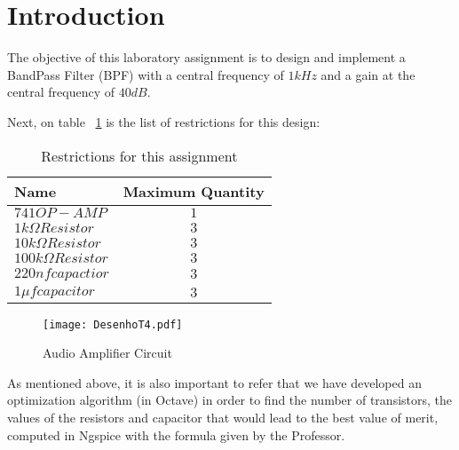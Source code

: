\newpage
\section{Introduction}
\label{sec:introduction}

The objective of this laboratory assignment is to design and implement a BandPass Filter (BPF) with a central frequency of $1kHz$ and a gain at the central frequency of $40dB$.

Next, on table ~\ref{tab:restrictions} is the list of restrictions for this design:

\begin{table}[h]
    \centering
    \begin{tabular}{|l|c|}
    \hline
    {\bf Name} & {\bf Maximum Quantity} \\ \hline
    $741 OP-AMP$ & $1$ \\ \hline
    $1k{\Omega} Resistor$ & $3$ \\ \hline
    $10k{\Omega}Resistor$ & $3$ \\ \hline
    $100k{\Omega} Resistor$ & $3$ \\ \hline
    $220nf  capactior$ & $3$ \\ \hline
    $1{\mu}f  capacitor$ & $3$ \\ \hline
    \end{tabular}
    \caption{Restrictions for this assignment}
    \label{tab:restrictions}
\end{table}


\begin{figure}[!ht] \centering

\caption{Audio Amplifier Circuit}
\squeezeup
\squeezeup



\texttt{[image: DesenhoT4.pdf]}  
\squeezeup
\squeezeup
\squeezeup
\squeezeup
\squeezeup
\squeezeup
\label{fig:circuit}
\end{figure}

As mentioned above, it is also important to refer that we have developed an optimization algorithm (in Octave) in order to find the number of transistors, the values of the resistors and capacitor that would lead to the best value of merit, computed in Ngspice with the formula given by the Professor.   

